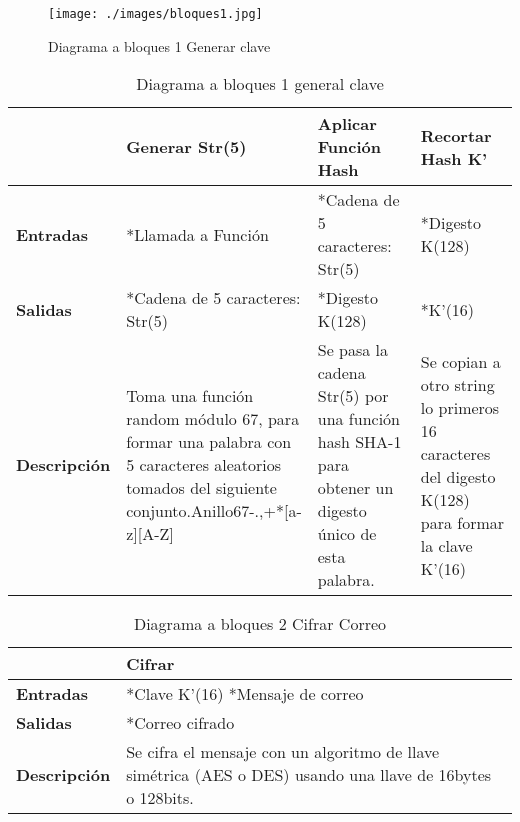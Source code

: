 \documentclass[12pt,oneside,onecolumn,openany]{report}
\begin{document}
\newpage
\newpage
\begin{figure}[H]
	\texttt{[image: ./images/bloques1.jpg]}
	\caption{Diagrama a bloques 1 Generar clave}
	\label{fig:5-2-1}
\end{figure}
\begin{table}[H]
 \centering
   {
     \begin{tabular}{| p{4cm} | p{4cm} | p{4cm} | p{4cm} |}
     \hline
     & \textbf{Generar Str(5)} & \textbf{Aplicar Función Hash} & \textbf{Recortar Hash K’}\\
     \hline
     \textbf{Entradas} & *Llamada a Función & *Cadena de 5 caracteres: Str(5) & *Digesto K(128)\\
     \hline
     \textbf{Salidas} & *Cadena de 5 caracteres: Str(5) & *Digesto K(128) & *K’(16)\\
     \hline
     \textbf{Descripción} & Toma una función random módulo 67, para formar una palabra con 5 caracteres aleatorios tomados del siguiente conjunto.Anillo67{-.,+*[a-z][A-Z]} & Se pasa la cadena Str(5) por una función hash SHA-1 para obtener un digesto único de esta palabra. & Se copian a otro string lo primeros 16 caracteres del digesto K(128) para formar la clave K’(16)\\

    \end{tabular}
    }
    \caption{Diagrama a bloques 1 general clave}
    \label{tabla:b1}
\end{table}

\begin{table}[H]
 \centering
   {
     \begin{tabular}{| p{3cm} | p{3cm} |}
     \hline
     & \textbf{Cifrar}\\
     \hline
     \textbf{Entradas} & *Clave K’(16) *Mensaje de correo\\
     \hline
     \textbf{Salidas} & *Correo cifrado\\
     \hline
     \textbf{Descripción} & Se cifra el mensaje con un algoritmo de llave simétrica (AES o DES) usando una llave de 16bytes o 128bits.\\

    \end{tabular}
    }
    \caption{Diagrama a bloques 2 Cifrar Correo}
    \label{tabla:b2}
\end{table}
\end{document}
